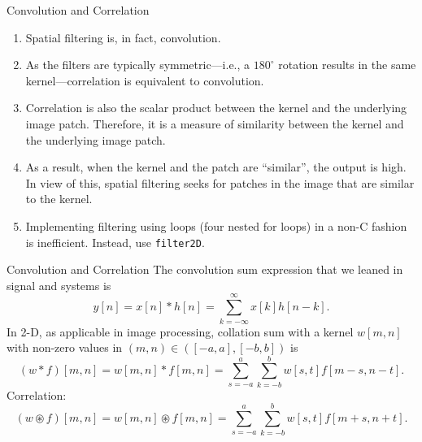 \begin{frame}{Convolution and Correlation}
    \begin{enumerate}
        \item Spatial filtering is, in fact, convolution.
        \item As the filters are typically symmetric---i.e., a $180^\circ$ rotation results in the same kernel---correlation is equivalent to convolution.
        \item Correlation is also the scalar product between the kernel and the underlying image patch. Therefore, it is a measure of similarity between the kernel and the underlying image patch.
        \item As a result, when the kernel and the patch are ``similar'', the output is high. In view of this, spatial filtering seeks for patches in the image that are similar  to the kernel.
        \item Implementing filtering using loops (four nested for loops) in a non-C fashion is inefficient. Instead, use \lstinline!filter2D!.
    \end{enumerate}
\end{frame}


\begin{frame}{Convolution and Correlation}
    The convolution sum expression that we leaned in signal and systems is
    \begin{equation*}\label{eq:1d_conv_sum}
        y[n] = x[n]\ast h[n] = \sum_{k=-\infty}^{\infty}x[k]h[n-k].
    \end{equation*}
    In 2-D, as applicable in image processing, collation sum with a kernel $w[m,n]$ with non-zero values in $(m,n) \in ([-a,a], [-b,b])$ is
    \begin{equation*}\label{eq:2d_conv_sum}
        (w\ast f)[m,n] = w[m,n]\ast f[m,n] = \sum_{s=-a}^{a}\sum_{k=-b}^{b} w[s,t]f[m-s, n-t].
    \end{equation*}
    Correlation:
    \begin{equation*}\label{eq:2d_conv_sum}
        (w\circledast f)[m,n] = w[m,n]\circledast f[m,n] = \sum_{s=-a}^{a}\sum_{k=-b}^{b} w[s,t]f[m+s, n+t].
    \end{equation*}
\end{frame}

